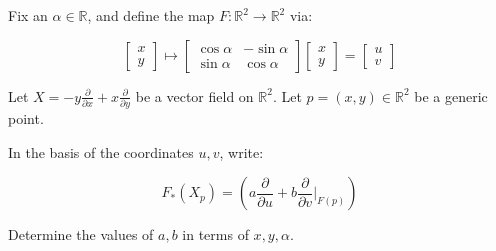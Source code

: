 \documentclass[10pt]{article}
\newenvironment{problem}[2][]{\begin{trivlist}
\item[\hskip \labelsep {\bfseries #1}\hskip \labelsep {\bfseries #2.}]}{\end{trivlist}}
\begin{document}
\begin{problem}{Question 2}

Fix an $\alpha \in \mathbb{R}$, and define the map $F: \mathbb{R}^2 \to \mathbb{R}^2$ via:

$$ \begin{bmatrix} x \\ y \end{bmatrix} \mapsto  \begin{bmatrix} \cos\alpha & -\sin \alpha \\ \sin\alpha & \cos\alpha \end{bmatrix} \begin{bmatrix} x \\ y \end{bmatrix} = \begin{bmatrix} u \\ v \end{bmatrix}$$

Let $X = -y \frac{\partial}{\partial x}+ x \frac{\partial}{\partial y}$ be a vector field on $\mathbb{R}^2$. Let $p = (x,y) \in \mathbb{R}^2$ be a generic point.

In the basis of the coordinates $u,v$, write:

$$F_*(X_p) = \left( a \frac{\partial}{\partial u}+ b \frac{\partial}{\partial v} \bigg|_{F(p)} \right) $$

Determine the values of $a,b$ in terms of $x,y, \alpha$.

\end{problem}
\end{document}
